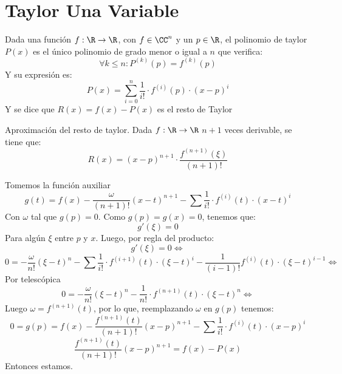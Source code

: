 \documentclass{article}
\begin{document}
    \section*{Taylor Una Variable}
    \begin{defi}
        Dada una función $f : \R \to \R$, con $f \in \CC^n$ y un $p \in \R$, el polinomio de taylor $P(x)$ es el único polinomio de grado menor o igual a $n$ que verifica:
        \[
            \forall k \leq n : P^{(k)}(p) = f^{(k)}(p)
        \]
        Y su expresión es:
        \[
            P(x) = \sum_{i=0}^n \frac{1}{i!} \cdot f^{(i)}(p) \cdot (x-p)^i
        \]
        Y se dice que $R(x) = f(x) - P(x)$ es el resto de Taylor
    \end{defi}
    \begin{teo}
        Aproximación del resto de taylor.
        Dada $f : \R \to \R$ $n+1$ veces derivable, se tiene que:
        \[
            R(x) = (x-p)^{n+1} \cdot \frac{f^{(n+1)}(\xi)}{(n+1)!}
        \]
    \end{teo}
    \begin{demo}
        Tomemos la función auxiliar
        \[g(t) = f(x) - \frac{\omega}{(n+1)!}(x-t)^{n+1} -\sum \frac{1}{i!} \cdot f^{(i)}(t) \cdot (x-t)^i\]
        Con $\omega$ tal que $g(p) = 0$. Como $g(p) = g(x) = 0$, tenemos que:
        \[
            g'(\xi) = 0
        \]
        Para algún $\xi$ entre $p$ y $x$. Luego, por regla del producto:
        \[
            g'(\xi) = 0 \iff
        \]
        \[
            0 = - \frac{\omega}{n!}(\xi-t)^{n} - \sum \frac{1}{i!} \cdot f^{(i+1)}(t) \cdot (\xi-t)^i - \frac{1}{(i-1)!}f^{(i)}(t) \cdot (\xi - t)^{i-1} \iff
        \]
        Por telescópica
        \[
            0 = - \frac{\omega}{n!}(\xi-t)^{n} - \frac{1}{n!} \cdot f^{(n+1)}(t) \cdot (\xi-t)^n\iff
        \]
        Luego $\omega = f^{(n+1)}(t)$, por lo que, reemplazando $\omega$ en $g(p)$ tenemos:
        \[0 = g(p) = f(x) - \frac{f^{(n+1)}(t)}{(n+1)!}(x-p)^{n+1} -\sum \frac{1}{i!} \cdot f^{(i)}(t) \cdot (x-p)^i\]
        \[
            \frac{f^{(n+1)}(t)}{(n+1)!}(x-p)^{n+1} =
            f(x) - P(x)
        \]
        Entonces estamos.
    \end{demo}
\end{document}
